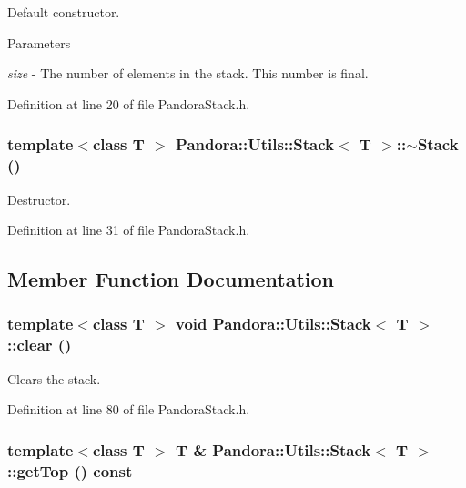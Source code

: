 Default constructor. 
\begin{DoxyParams}{Parameters}
\item[{\em size}]-\/ The number of elements in the stack. This number is final. \end{DoxyParams}


Definition at line 20 of file PandoraStack.h.\hypertarget{classPandora_1_1Utils_1_1Stack_a57c562706664edfabf43169405d5c247}{
\subsubsection[{$\sim$Stack}]{\setlength{\rightskip}{0pt plus 5cm}template$<$class T $>$ {\bf Pandora::Utils::Stack}$<$ T $>$::$\sim${\bf Stack} ()}}
\label{classPandora_1_1Utils_1_1Stack_a57c562706664edfabf43169405d5c247}


Destructor. 

Definition at line 31 of file PandoraStack.h.

\subsection{Member Function Documentation}
\hypertarget{classPandora_1_1Utils_1_1Stack_acbedc5107a2e03fe9a53d044efdcbabf}{
\subsubsection[{clear}]{\setlength{\rightskip}{0pt plus 5cm}template$<$class T $>$ void {\bf Pandora::Utils::Stack}$<$ T $>$::clear ()}}
\label{classPandora_1_1Utils_1_1Stack_acbedc5107a2e03fe9a53d044efdcbabf}


Clears the stack. 

Definition at line 80 of file PandoraStack.h.\hypertarget{classPandora_1_1Utils_1_1Stack_a9bdcdee9e004ce12b8dcfc36663d0eac}{
\subsubsection[{getTop}]{\setlength{\rightskip}{0pt plus 5cm}template$<$class T $>$ T \& {\bf Pandora::Utils::Stack}$<$ T $>$::getTop () const}}
\label{classPandora_1_1Utils_1_1Stack_a9bdcdee9e004ce12b8dcfc36663d0eac}


